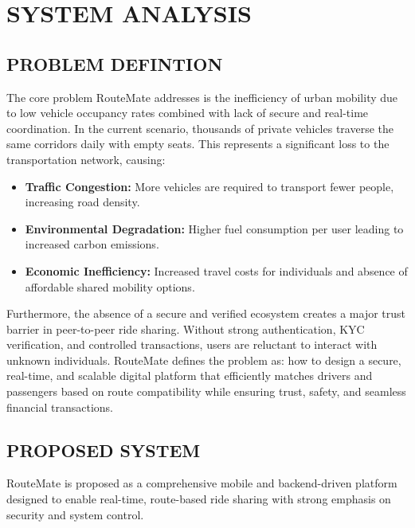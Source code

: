 \documentclass[10pt,a4paper]{report}
\begin{document}
\newpage
\chapter{SYSTEM ANALYSIS}

\section{\textbf{PROBLEM DEFINTION}}
\large\justify
The core problem RouteMate addresses is the inefficiency of urban mobility due to low vehicle occupancy rates combined with lack of secure and real-time coordination. In the current scenario, thousands of private vehicles traverse the same corridors daily with empty seats. This represents a significant loss to the transportation network, causing:

\begin{itemize}
    \item \textbf{Traffic Congestion:} More vehicles are required to transport fewer people, increasing road density.
    \item \textbf{Environmental Degradation:} Higher fuel consumption per user leading to increased carbon emissions.
    \item \textbf{Economic Inefficiency:} Increased travel costs for individuals and absence of affordable shared mobility options.
\end{itemize}

\vspace{0.5em}
\noindent Furthermore, the absence of a secure and verified ecosystem creates a major trust barrier in peer-to-peer ride sharing. Without strong authentication, KYC verification, and controlled transactions, users are reluctant to interact with unknown individuals. RouteMate defines the problem as: how to design a secure, real-time, and scalable digital platform that efficiently matches drivers and passengers based on route compatibility while ensuring trust, safety, and seamless financial transactions.

\section{\textbf{PROPOSED SYSTEM}}
\large\justify
RouteMate is proposed as a comprehensive mobile and backend-driven platform designed to enable real-time, route-based ride sharing with strong emphasis on security and system control.
\end{document}
